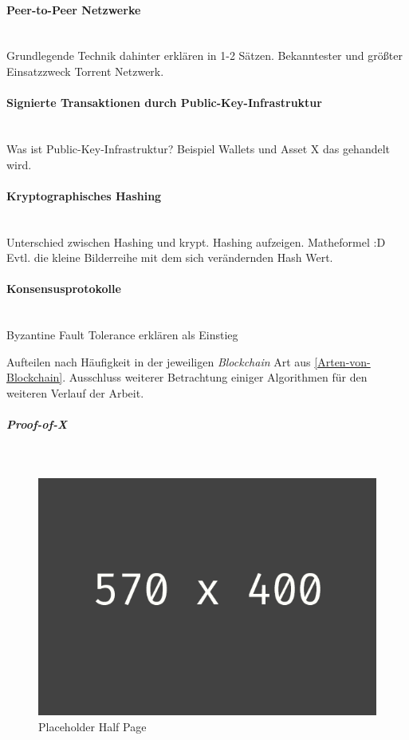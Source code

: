 \paragraph{Peer-to-Peer Netzwerke}$~~$\\
Grundlegende Technik dahinter erklären in 1-2 Sätzen. Bekanntester und größter Einsatzzweck Torrent Netzwerk.

\paragraph{Signierte Transaktionen durch Public-Key-Infrastruktur}$~~$\\
Was ist Public-Key-Infrastruktur?
Beispiel Wallets und Asset X das gehandelt wird.

\paragraph{Kryptographisches Hashing}$~~$\\
Unterschied zwischen Hashing und krypt. Hashing aufzeigen. Matheformel :D
Evtl. die kleine Bilderreihe mit dem sich verändernden Hash Wert.
\citep{Diffie1976}

\paragraph{Konsensusprotokolle}$~~$\\
Byzantine Fault Tolerance erklären als Einstieg

Aufteilen nach Häufigkeit in der jeweiligen \textit{Blockchain} Art aus \ref{Arten-von-Blockchain}.
Ausschluss weiterer Betrachtung einiger Algorithmen für den weiteren Verlauf der Arbeit.


\subparagraph{Proof-of-X}$~~$\\
\begin{figure}[h!]
	\centering
	\includegraphics[width=1.0\linewidth]{pictures/placeholder_half_page}
	\caption[Placeholder Half Page]{Placeholder Half Page}
	\label{fig:placeholder_half_page}
\end{figure}


